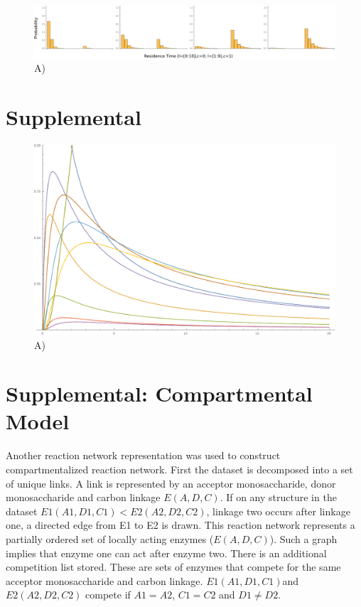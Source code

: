 \documentclass{article}
\begin{document}
\begin{figure}[H]
    \includegraphics[width=\textwidth]{Supp_4.pdf}
	\caption{A)}
\end{figure}

\section*{Supplemental}
\begin{figure}[H]
    \includegraphics[width=\textwidth]{Supp_5.pdf}
	\caption{A)}
\end{figure}

\section*{Supplemental: Compartmental Model}
Another reaction network representation was used to construct compartmentalized reaction network. First the dataset is decomposed into a set of unique links. A link is represented by an acceptor monosaccharide, donor monosaccharide and carbon linkage $E(A,D,C)$. If on any structure in the dataset $E1(A1,D1,C1)<E2(A2,D2,C2)$, linkage two occurs after linkage one, a directed edge from E1 to E2 is drawn. This reaction network represents a partially ordered set of locally acting enzymes ($E(A,D,C)$). Such a graph implies that enzyme one can act after enzyme two. There is an additional competition list stored. These are sets of enzymes that compete for the same acceptor monosaccharide and carbon linkage. $E1(A1,D1,C1)$and $E2(A2,D2,C2)$ compete if $A1=A2$, $C1=C2$ and $D1\neq D2$.
\end{document}
